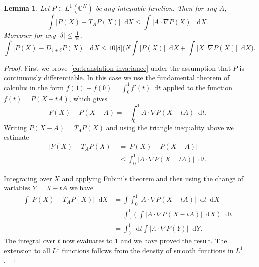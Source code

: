 \documentclass[11pt]{article}
\theoremstyle{plain}
\theoremstyle{plain}
\newtheorem{lem}{Lemma}
\theoremstyle{plain}
\theoremstyle{plain}
\theoremstyle{plain}
\theoremstyle{plain}
\theoremstyle{plain}
\theoremstyle{remark}
\theoremstyle{remark}
\theoremstyle{plain}
\theoremstyle{plain}
\theoremstyle{plain}
\theoremstyle{plain}
\newcommand{\Complex}{\mathbb C}
\newcommand{\diff}{\mathop{}\!\mathrm{d}}
\begin{document}
\begin{lem}
\label{lem:approximate-invariance}
Let $P\in L^1(\Complex^N)$ be any integrable function.  Then for any
$A$,
\begin{equation}
\label{eq:translation-invariance}
\int |P(X) - T_A P(X)| \diff X \leq \int |A\cdot\nabla P(X)|\diff X.
\end{equation}
Moreover for any $|\delta|\leq \frac{1}{10}$,
\begin{equation}
\label{eq:dilation-invariance}
\int |P(X) - D_{1+\delta}P(X)| \diff X
\leq 10 |\delta| \big(N\int |P(X)|\diff X + \int |X| |\nabla P(X)|\diff X).
\end{equation}
\end{lem}
\begin{proof}
First we prove~\eqref{eq:translation-invariance} under the assumption that $P$
is continuously differentiable.  In this case we use the fundamental theorem of calculus 
in the form $f(1)-f(0) = \int_0^1 f'(t)\diff t$ applied
to the function $f(t) = P(X-tA)$, which gives
\begin{equation}
P(X) - P(X-A) = -\int_0^1 A \cdot \nabla P(X-tA) \diff t.
\end{equation}
Writing $P(X-A) = T_AP(X)$ and using the triangle inequality above we estimate
\begin{align*}
|P(X)-T_AP(X)| &= |P(X)-P(X-A)| \\
&\leq \int_0^1 |A\cdot \nabla P(X-tA)| \diff t.
\end{align*}

Integrating over $X$ and applying Fubini's theorem and then using the change of variables $Y=X-tA$
we have
\begin{equation}
\begin{split}
\int |P(X) - T_AP(X)| \diff X 
&= \int \int_0^1 |A\cdot \nabla P(X-tA)| \diff t \diff X \\
&= \int_0^1 (\int |A\cdot \nabla P(X-tA)| \diff X) \diff t \\
&= \int_0^1 \diff t \int |A\cdot \nabla P(Y)| \diff Y.
\end{split}
\end{equation}
The integral over $t$ now evaluates to $1$ and we have proved the result.
The extension to all $L^1$ functions follows from the density of smooth
functions in $L^1$.


\end{proof}
\end{document}
